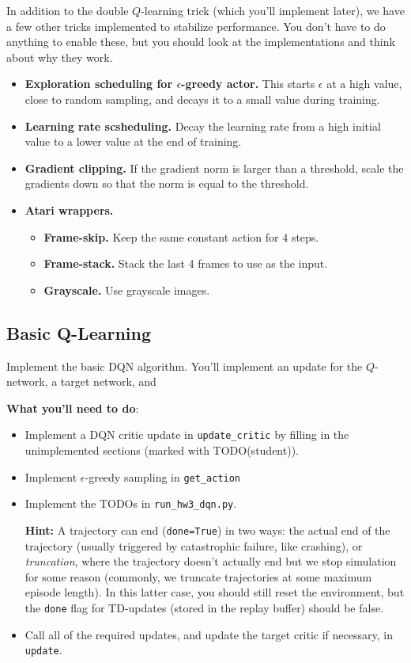 In addition to the double $Q$-learning trick (which you'll implement later), we have a few other tricks implemented to stabilize performance. You don't have to do anything to enable these, but you should look at the implementations and think about why they work.
\begin{itemize}
    \item \textbf{Exploration scheduling for $\epsilon$-greedy actor.} This starts $\epsilon$ at a high value, close to random sampling, and decays it to a small value during training.
    \item \textbf{Learning rate scsheduling.} Decay the learning rate from a high initial value to a lower value at the end of training.
    \item \textbf{Gradient clipping.} If the gradient norm is larger than a threshold, scale the gradients down so that the norm is equal to the threshold.
    \item \textbf{Atari wrappers.}
    \begin{itemize}
        \item \textbf{Frame-skip.} Keep the same constant action for 4 steps.
        \item \textbf{Frame-stack.} Stack the last 4 frames to use as the input.
        \item \textbf{Grayscale.} Use grayscale images.
    \end{itemize}
\end{itemize}

\subsection{Basic Q-Learning}

Implement the basic DQN algorithm. You'll implement an update for the $Q$-network, a target network, and 

\textbf{What you'll need to do}:
\begin{itemize}
    \item Implement a DQN critic update in \verb|update_critic| by filling in the unimplemented sections (marked with TODO(student)).
    \item Implement $\epsilon$-greedy sampling in \verb|get_action|
    \item Implement the TODOs in \verb|run_hw3_dqn.py|.

    \textbf{Hint:} A trajectory can end (\verb|done=True|) in two ways: the actual end of the trajectory (usually triggered by catastrophic failure, like crashing), or \textit{truncation}, where the trajectory doesn't actually end but we stop simulation for some reason (commonly, we truncate trajectories at some maximum episode length). In this latter case, you should still reset the environment, but the \verb|done| flag for TD-updates (stored in the replay buffer) should be false.
    \item Call all of the required updates, and update the target critic if necessary, in \verb|update|.
\end{itemize}

